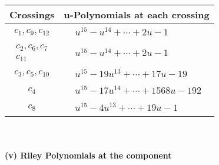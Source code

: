 \documentclass[1p]{elsarticle_modified}
\theoremstyle{definition}
\begin{document}
\begin{tabular}{m{50pt}|m{274pt}}
Crossings & \hspace{64pt}u-Polynomials at each crossing \\
\hline $$\begin{aligned}c_{1},c_{9},c_{12}\end{aligned}$$&$\begin{aligned}
&u^{15}- u^{14}+\cdots+2 u-1
\end{aligned}$\\
\hline $$\begin{aligned}c_{2},c_{6},c_{7}\\c_{11}\end{aligned}$$&$\begin{aligned}
&u^{15}- u^{14}+\cdots+2 u-1
\end{aligned}$\\
\hline $$\begin{aligned}c_{3},c_{5},c_{10}\end{aligned}$$&$\begin{aligned}
&u^{15}-19 u^{13}+\cdots+17 u-19
\end{aligned}$\\
\hline $$\begin{aligned}c_{4}\end{aligned}$$&$\begin{aligned}
&u^{15}-17 u^{14}+\cdots+1568 u-192
\end{aligned}$\\
\hline $$\begin{aligned}c_{8}\end{aligned}$$&$\begin{aligned}
&u^{15}-4 u^{13}+\cdots+19 u-1
\end{aligned}$\\
\hline
\end{tabular}\\~\\
\newpage\renewcommand{\arraystretch}{1}
\flushleft \textbf{(v) Riley Polynomials at the component}\newline \\
\end{document}
